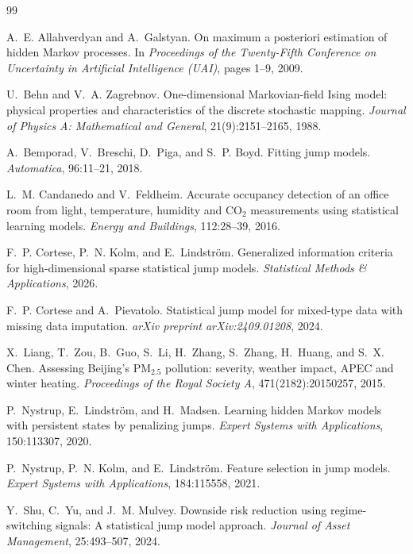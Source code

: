 \documentclass[11pt]{article}
\begin{document}
\begin{thebibliography}{99}

A.~E. Allahverdyan and A.~Galstyan.
\newblock On maximum a posteriori estimation of hidden {M}arkov processes.
\newblock In \emph{Proceedings of the Twenty-Fifth Conference on Uncertainty in Artificial Intelligence (UAI)}, pages 1--9, 2009.

U.~Behn and V.~A. Zagrebnov.
\newblock One-dimensional {M}arkovian-field {I}sing model: physical properties and characteristics of the discrete stochastic mapping.
\newblock \emph{Journal of Physics A: Mathematical and General}, 21(9):2151--2165, 1988.

A.~Bemporad, V.~Breschi, D.~Piga, and S.~P. Boyd.
\newblock Fitting jump models.
\newblock \emph{Automatica}, 96:11--21, 2018.

L.~M. Candanedo and V.~Feldheim.
\newblock Accurate occupancy detection of an office room from light, temperature, humidity and $\mathrm{CO}_2$ measurements using statistical learning models.
\newblock \emph{Energy and Buildings}, 112:28--39, 2016.

F.~P. Cortese, P.~N. Kolm, and E.~Lindstr{\"o}m.
\newblock Generalized information criteria for high-dimensional sparse statistical jump models.
\newblock \emph{Statistical Methods \& Applications}, 2026.

F.~P. Cortese and A.~Pievatolo.
\newblock Statistical jump model for mixed-type data with missing data imputation.
\newblock \emph{arXiv preprint arXiv:2409.01208}, 2024.

X.~Liang, T.~Zou, B.~Guo, S.~Li, H.~Zhang, S.~Zhang, H.~Huang, and S.~X. Chen.
\newblock Assessing {B}eijing's $\mathrm{PM}_{2.5}$ pollution: severity, weather impact, {APEC} and winter heating.
\newblock \emph{Proceedings of the Royal Society A}, 471(2182):20150257, 2015.

P.~Nystrup, E.~Lindstr{\"o}m, and H.~Madsen.
\newblock Learning hidden {M}arkov models with persistent states by penalizing jumps.
\newblock \emph{Expert Systems with Applications}, 150:113307, 2020.

P.~Nystrup, P.~N. Kolm, and E.~Lindstr{\"o}m.
\newblock Feature selection in jump models.
\newblock \emph{Expert Systems with Applications}, 184:115558, 2021.

Y.~Shu, C.~Yu, and J.~M. Mulvey.
\newblock Downside risk reduction using regime-switching signals: A statistical jump model approach.
\newblock \emph{Journal of Asset Management}, 25:493--507, 2024.

\end{thebibliography}
\end{document}
